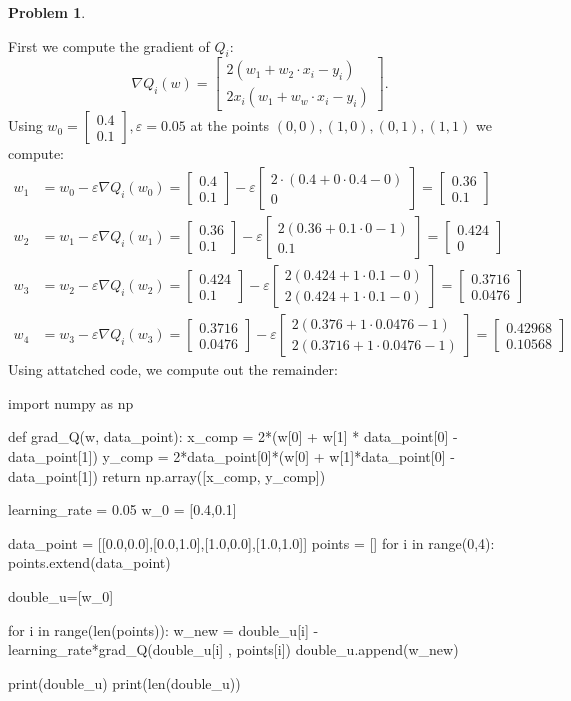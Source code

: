 \documentclass[12pt, a4paper]{article}
\title{}
\author{A.N.}
\date{\today}
\newtheorem{problem}{Problem}
\theoremstyle{definition}
\newcommand{\grad}{\nabla}
\newcommand{\ep}{\varepsilon}
\newcommand{\bmat}[1]{\begin{bmatrix}#1\end{bmatrix}}
\begin{document}
	
	
	
\begin{problem}
\end{problem}
First we compute the gradient of $Q_i$: 
$$ \grad Q_i(w) = \bmat{2(w_1 + w_2 \cdot x_i - y_i ) \\ 2x_i(w_1 + w_w \cdot x_i - y_i)} .$$
Using $w_0 = \bmat{0.4 \\ 0.1}, \ep = 0.05$ at the points $(0,0),(1,0), (0,1), (1,1) $ we compute: 
\begin{align*}
		w_1 & = w_0 - \ep\grad Q_i(w_0) = \bmat{0.4 \\ 0.1} - \ep \bmat{ 2 \cdot (0.4+ 0 \cdot 0.4 - 0) \\ 0} = \bmat{0.36 \\ 0.1} 
		\\ w_2 & = w_1 - \ep \grad Q_i ( w_1) = \bmat{0.36 \\ 0.1 } - \ep \bmat{2(0.36 + 0.1 \cdot 0 - 1) \\ 0.1}  = \bmat{0.424 \\ 0}
	\\ w_3 & = w_2 -\ep \grad Q_i (w_2) = \bmat{0.424 \\ 0.1 } - \ep \bmat{2 ( 0.424 + 1 \cdot 0.1 - 0) \\ 2(0.424 + 1 \cdot 0.1 - 0)} = \bmat{0.3716 \\ 0.0476}
	\\ w_4 & = w_3 - \ep \grad Q_i (w_3)  = \bmat{0.3716 \\ 0.0476} - \ep \bmat{2 (0.376 + 1 \cdot 0.0476  - 1) 
	\\ 2 (0.3716 + 1 \cdot 0.0476 - 1)} = \bmat{0.42968 \\ 0.10568}
\end{align*}
Using attatched code, we compute out the remainder: 
\begin{python}
import numpy as np
		
def grad_Q(w, data_point):
	x_comp = 2*(w[0] + w[1] * data_point[0] - data_point[1])
	y_comp = 2*data_point[0]*(w[0] + w[1]*data_point[0] - data_point[1])
	return np.array([x_comp, y_comp])
	
learning_rate = 0.05
w_0 = [0.4,0.1]
		
data_point = [[0.0,0.0],[0.0,1.0],[1.0,0.0],[1.0,1.0]]
points = []
for i in range(0,4):
points.extend(data_point)
	
double_u=[w_0]
		
for i in range(len(points)):
	w_new = double_u[i] - learning_rate*grad_Q(double_u[i] , points[i])
	double_u.append(w_new)
	
print(double_u)
print(len(double_u))
\end{python}
\end{document}
